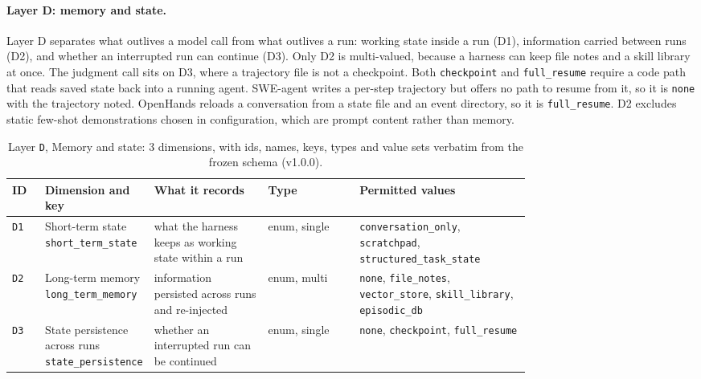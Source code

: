 \paragraph{Layer D: memory and state.}\label{subsec:layer-d}
Layer D separates what outlives a model call from what outlives a run: working state inside a run (D1),
information carried between runs (D2), and whether an interrupted run can continue (D3). Only D2 is
multi-valued, because a harness can keep file notes and a skill library at once. The judgment call sits
on D3, where a trajectory file is not a checkpoint. Both \texttt{checkpoint} and \texttt{full\_resume}
require a code path that reads saved state back into a running agent. SWE-agent writes a per-step
trajectory but offers no path to resume from it, so it is \texttt{none} with the trajectory noted.
OpenHands reloads a conversation from a state file and an event directory, so it is
\texttt{full\_resume}. D2 excludes static few-shot demonstrations chosen in configuration, which are
prompt content rather than memory.

\begin{table}[htbp]
\caption{Layer \texttt{D}, Memory and state: 3 dimensions, with ids, names, keys, types and value
sets verbatim from the frozen schema (v1.0.0).}
\label{tab:coding-D}
\footnotesize
\begin{tabular}{@{}l p{0.20\linewidth} p{0.22\linewidth} l p{0.33\linewidth}@{}}
\toprule
ID & Dimension and key & What it records & Type & Permitted values \tabularnewline
\midrule
\texttt{D1} & \raggedright Short-term state \newline \texttt{short\_term\_state} & \raggedright what the harness keeps as working state within a run & enum, single & \raggedright \texttt{conversation\_only}, \texttt{scratchpad}, \texttt{structured\_task\_state} \tabularnewline
\texttt{D2} & \raggedright Long-term memory \newline \texttt{long\_term\_memory} & \raggedright information persisted across runs and re-injected & enum, multi & \raggedright \texttt{none}, \texttt{file\_notes}, \texttt{vector\_store}, \texttt{skill\_library}, \texttt{episodic\_db} \tabularnewline
\texttt{D3} & \raggedright State persistence across runs \newline \texttt{state\_persistence} & \raggedright whether an interrupted run can be continued & enum, single & \raggedright \texttt{none}, \texttt{checkpoint}, \texttt{full\_resume} \tabularnewline
\bottomrule
\end{tabular}
\end{table}

